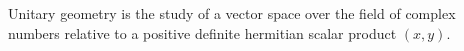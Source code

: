 Unitary geometry is the study of a vector space over the field of complex numbers relative to a positive definite hermitian scalar product $(x, y)$.
